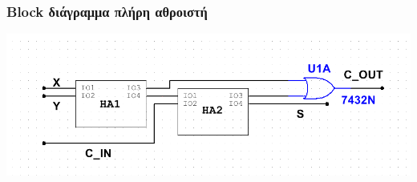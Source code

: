 \documentclass{article}
\begin{document}
\subsubsection{Block διάγραμμα πλήρη αθροιστή}
\includegraphics[width=\textwidth]{./res/fablock.png}

\renewcommand\refname{Πηγές}
\printbibliography
\end{document}
